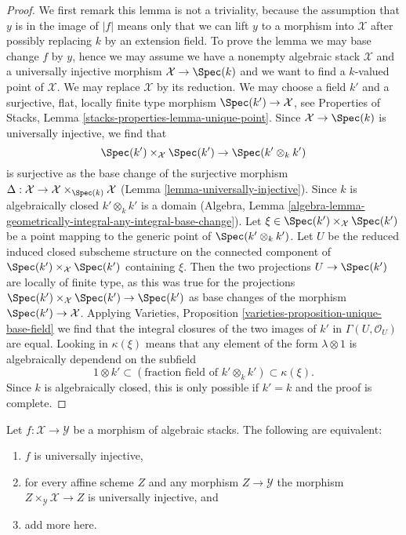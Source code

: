 \begin{proof}
We first remark this lemma is not a triviality, because the assumption that
$y$ is in the image of $|f|$ means only that we can lift
$y$ to a morphism into $\mathcal{X}$ after possibly replacing
$k$ by an extension field. To prove the lemma we may base change
$f$ by $y$, hence we may assume we have a nonempty algebraic stack
$\mathcal{X}$ and a universally injective morphism
$\mathcal{X} \to \Spec(k)$ and we want to find a $k$-valued point
of $\mathcal{X}$. We may replace $\mathcal{X}$ by its reduction.
We may choose a field $k'$ and a surjective, flat, locally finite type morphism
$\Spec(k') \to \mathcal{X}$, see
Properties of Stacks, Lemma \ref{stacks-properties-lemma-unique-point}.
Since $\mathcal{X} \to \Spec(k)$ is universally injective, we find that
$$
\Spec(k') \times_\mathcal{X} \Spec(k') \to \Spec(k' \otimes_k k')
$$
is surjective as the base change of the surjective morphism
$\Delta : \mathcal{X} \to \mathcal{X} \times_{\Spec(k)} \mathcal{X}$
(Lemma \ref{lemma-universally-injective}).
Since $k$ is algebraically closed $k' \otimes_k k'$ is a domain
(Algebra, Lemma
\ref{algebra-lemma-geometrically-integral-any-integral-base-change}).
Let $\xi \in \Spec(k') \times_\mathcal{X} \Spec(k')$
be a point mapping to the generic point of $\Spec(k' \otimes_k k')$.
Let $U$ be the reduced induced closed subscheme structure on
the connected component of $\Spec(k') \times_\mathcal{X} \Spec(k')$
containing $\xi$. Then the two projections $U \to \Spec(k')$
are locally of finite type, as this was true for the projections
$\Spec(k') \times_\mathcal{X} \Spec(k') \to \Spec(k')$
as base changes of the morphism $\Spec(k') \to \mathcal{X}$.
Applying
Varieties, Proposition \ref{varieties-proposition-unique-base-field}
we find that the integral closures of the two images
of $k'$ in $\Gamma(U, \mathcal{O}_U)$ are equal.
Looking in $\kappa(\xi)$ means that any element of the form
$\lambda \otimes 1$ is algebraically dependend on
the subfield
$$
1 \otimes k' \subset 
(\text{fraction field of }k' \otimes_k k') \subset
\kappa(\xi).
$$
Since $k$ is algebraically closed, this is only possible
if $k' = k$ and the proof is complete.
\end{proof}

\begin{lemma}
\label{lemma-universally-injective-local}
Let $f : \mathcal{X} \to \mathcal{Y}$ be a morphism of algebraic stacks.
The following are equivalent:
\begin{enumerate}
\item $f$ is universally injective,
\item for every affine scheme $Z$ and any morphism
$Z \to \mathcal{Y}$ the morphism $Z \times_\mathcal{Y} \mathcal{X} \to Z$
is universally injective, and
\item add more here.
\end{enumerate}
\end{lemma}


